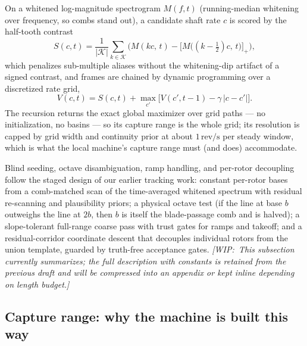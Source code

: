 \documentclass[journal]{IEEEtran}
\newcommand{\revps}{\ensuremath{\,\mathrm{rev/s}}}
\newcommand{\wip}[1]{{\color{gray!70!black}\textit{[WIP:~#1]}}}
\begin{document}
On a whitened log-magnitude spectrogram $M(f,t)$ (running-median
whitening over frequency, so combs stand out), a candidate shaft rate
$c$ is scored by the half-tooth contrast
\begin{equation}
  S(c,t) = \frac{1}{|\mathcal{K}|}\sum_{k \in \mathcal{K}}
  \Big( M(kc,\, t) - \big[M\big((k{-}\tfrac12)c,\, t\big)\big]_+ \Big),
  \label{eq:combscore}
\end{equation}
which penalizes sub-multiple aliases without the whitening-dip artifact
of a signed contrast, and frames are chained by dynamic programming over
a discretized rate grid,
\begin{equation}
  V(c,t) = S(c,t) + \max_{c'} \big[ V(c', t{-}1) - \gamma\, |c - c'|
  \big].
  \label{eq:viterbi}
\end{equation}
The recursion returns the exact global maximizer over grid paths --- no
initialization, no basins --- so its capture range is the whole grid;
its resolution is capped by grid width and continuity prior at about
$1\revps$ per steady window, which is what the local machine's capture
range must (and does) accommodate.

Blind seeding, octave disambiguation, ramp handling, and per-rotor
decoupling follow the staged design of our earlier tracking work:
constant per-rotor bases from a comb-matched scan of the time-averaged
whitened spectrum with residual re-scanning and plausibility priors; a
physical octave test (if the line at base $b$ outweighs the line at
$2b$, then $b$ is itself the blade-passage comb and is halved); a
slope-tolerant full-range coarse pass with trust gates for ramps and
takeoff; and a residual-corridor coordinate descent that decouples
individual rotors from the union template, guarded by truth-free
acceptance gates. \wip{This subsection currently summarizes; the full
description with constants is retained from the previous draft and will
be compressed into an appendix or kept inline depending on length
budget.}

\subsection{Capture range: why the machine is built this way}
\label{sec:capture}
\end{document}
